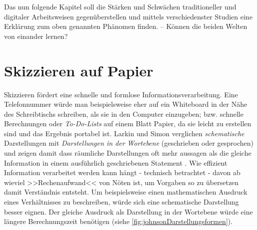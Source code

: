 \medskip Das nun folgende Kapitel soll die Stärken und Schwächen traditioneller und digitaler Arbeitsweisen gegenüberstellen und mittels verschiedenster Studien eine Erklärung zum oben genannten Phänomen finden. -- Können die beiden Welten von einander lernen?

\section{Skizzieren auf Papier}
Skizzieren fördert eine schnelle und formlose Informationsverarbeitung. Eine Telefonnummer würde man beispielsweise eher auf ein Whiteboard in der Nähe des Schreibtischs schreiben, als sie in den Computer einzugeben; bzw. schnelle Berechnungen oder \emph{To-Do-Lists} auf einem Blatt Papier, da sie leicht zu erstellen sind und das Ergebnis portabel ist.
Larkin und Simon verglichen \emph{schematische} Darstellungen mit \emph{Darstellungen in der Wortebene} (geschrieben oder gesprochen) und zeigen damit dass räumliche Darstellungen oft mehr aussagen als die gleiche Information in einem ausführlich geschriebenen Statement \citep{Larkin:1987}. Wie effizient Information verarbeitet werden kann hängt - technisch betrachtet - davon ab wieviel >>Rechenaufwand<< von Nöten ist, um Vorgaben so zu übersetzen damit Verständnis entsteht. Um beispielsweise einen mathematischen Ausdruck eines Verhältnisses zu beschreiben, würde sich eine schematische Darstellung besser eignen. Der gleiche Ausdruck als Darstellung in der Wortebene würde eine längere Berechnungszeit benötigen (siehe \autoref{fig:johnsonDarstellungsformen}).

